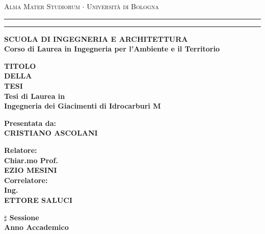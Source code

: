 \begin{titlepage}
\begin{center}
{{\Large{\textsc{Alma Mater Studiorum $\cdot$ Universit\`a di
Bologna}}}} \rule[0.1cm]{\textwidth}{0.1mm}
\rule[0.5cm]{\textwidth}{0.6mm}
{\small{\bf SCUOLA DI INGEGNERIA  E ARCHITETTURA\\
Corso di Laurea in Ingegneria per l'Ambiente e il Territorio}}
\end{center}
\vspace{12mm}
\begin{center}
{\LARGE{\bf TITOLO}}\\
\vspace{3mm}
{\LARGE{\bf DELLA}}\\
\vspace{3mm}
{\LARGE{\bf TESI}}\\
\vspace{15mm} {\large{\bf Tesi di Laurea in \\Ingegneria dei Giacimenti di Idrocarburi M}}
\end{center}
\vspace{25mm}
\par
\noindent
\begin{minipage}[t]{0.47\textwidth}
{\large{\bf Presentata da:\\
CRISTIANO ASCOLANI}}
\end{minipage}
\hfill
\begin{minipage}[t]{0.47\textwidth}\raggedleft
{\large{\bf Relatore:\\
Chiar.mo Prof. \\EZIO MESINI\\}}
\vspace{5mm}
{\large{\bf Correlatore:\\
Ing.\\ ETTORE SALUCI}}
\end{minipage}
\vspace{15mm}
\begin{center}
{\large{\bf $\sharp$ Sessione\\
Anno Accademico }}
\end{center}
\end{titlepage}
